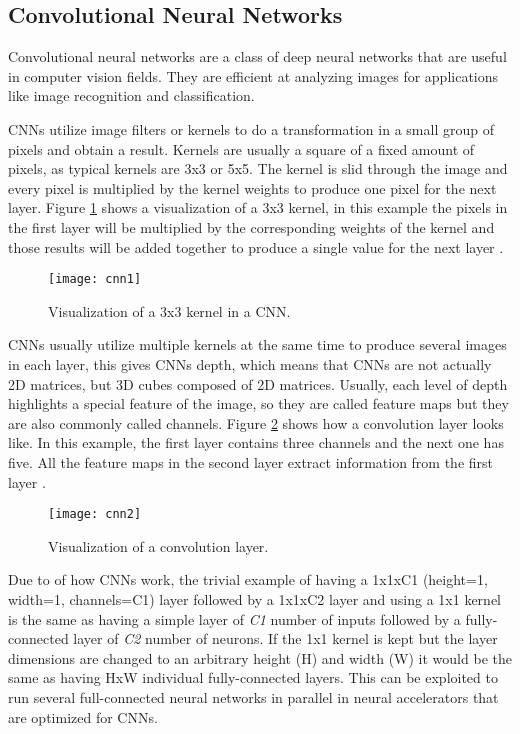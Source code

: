 \subsection{Convolutional Neural Networks}

Convolutional neural networks are a class of deep neural networks that are useful in computer vision fields. They are efficient at analyzing images for applications like image recognition and classification.

CNNs utilize image filters or kernels to do a transformation in a small group of pixels and obtain a result. Kernels are usually a square of a fixed amount of pixels, as typical kernels are 3x3 or 5x5. The kernel is slid through the image and every pixel is multiplied by the kernel weights to produce one pixel for the next layer. Figure \ref{fig:cnn1} shows a visualization of a 3x3 kernel, in this example the pixels in the first layer will be multiplied by the corresponding weights of the kernel and those results will be added together to produce a single value for the next layer \cite{guide_cnn}.

\begin{figure}[thbp]
	\centering
	\texttt{[image: cnn1]}
	\caption{Visualization of a 3x3 kernel in a CNN.}
	\label{fig:cnn1}
\end{figure}

CNNs usually utilize multiple kernels at the same time to produce several images in each layer, this gives CNNs depth, which means that CNNs are not actually 2D matrices, but 3D cubes composed of 2D matrices. Usually, each level of depth highlights a special feature of the image, so they are called feature maps but they are also commonly called channels. Figure \ref{fig:cnn2} shows how a convolution layer looks like. In this example, the first layer contains three channels and the next one has five. All the feature maps in the second layer extract information from the first layer \cite{guide_cnn}.

\begin{figure}[thbp]
	\centering
	\texttt{[image: cnn2]}
	\caption{Visualization of a convolution layer.}
	\label{fig:cnn2}
\end{figure}

Due to of how CNNs work, the trivial example of having a 1x1xC1 (height=1, width=1, channels=C1) layer followed by a 1x1xC2 layer and using a 1x1 kernel is the same as having a simple layer of \textit{C1} number of inputs followed by a fully-connected layer of \textit{C2} number of neurons. If the 1x1 kernel is kept but the layer dimensions are changed to an arbitrary height (H) and width (W) it would be the same as having HxW individual fully-connected layers. This can be exploited to run several full-connected neural networks in parallel in neural accelerators that are optimized for CNNs.

